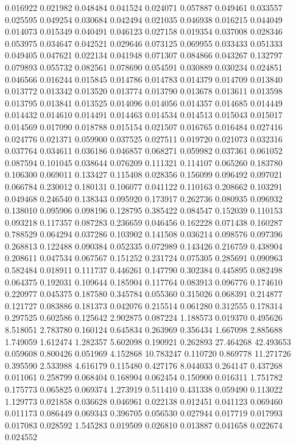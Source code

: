0.016922
0.021982
0.048484
0.041524
0.024071
0.057887
0.049461
0.033557
0.025595
0.049254
0.030684
0.042494
0.021035
0.046938
0.016215
0.044049
0.014073
0.015349
0.040491
0.046123
0.027158
0.019354
0.037008
0.028346
0.053975
0.034647
0.042521
0.029646
0.073125
0.069955
0.033433
0.051333
0.049405
0.047621
0.022134
0.041948
0.071307
0.084866
0.043267
0.132797
0.079893
0.055732
0.082561
0.078690
0.054591
0.030889
0.030234
0.024851
0.046566
0.016244
0.015845
0.014786
0.014783
0.014379
0.014709
0.013840
0.013772
0.013342
0.013520
0.013774
0.013790
0.013678
0.013611
0.013598
0.013795
0.013841
0.013525
0.014096
0.014056
0.014357
0.014685
0.014449
0.014432
0.014610
0.014491
0.014463
0.014534
0.014513
0.015043
0.015017
0.014569
0.017090
0.018788
0.015154
0.021507
0.016765
0.016484
0.027416
0.024776
0.021371
0.059900
0.037525
0.027511
0.019720
0.021073
0.032316
0.037764
0.034611
0.036186
0.046857
0.068271
0.059982
0.037361
0.061052
0.087594
0.101045
0.038644
0.076209
0.111321
0.114107
0.065260
0.183780
0.106300
0.069011
0.133427
0.115408
0.028356
0.156099
0.096492
0.097021
0.066784
0.230012
0.180131
0.106077
0.041122
0.110163
0.208662
0.103291
0.049468
0.246540
0.138343
0.095920
0.173917
0.262736
0.080935
0.096932
0.138010
0.095906
0.098196
0.128795
0.385422
0.084547
0.152039
0.110153
0.093218
0.117357
0.087283
0.236659
0.046456
0.162228
0.071438
0.160287
0.788529
0.064294
0.037286
0.103902
0.141508
0.036214
0.098576
0.097396
0.268813
0.122488
0.090384
0.052335
0.072989
0.143426
0.216759
0.438904
0.208611
0.047534
0.067567
0.151252
0.231724
0.075305
0.285691
0.090963
0.582484
0.018911
0.111737
0.446261
0.147790
0.302384
0.445895
0.082498
0.064375
0.192031
0.109644
0.185904
0.117764
0.083913
0.096776
0.174610
0.220977
0.045375
0.187580
0.345784
0.055360
0.315026
0.068391
0.214877
0.121727
0.083886
0.181373
0.042076
0.215514
0.061280
0.312555
0.178314
0.297525
0.602586
0.125642
2.902875
0.087224
1.188573
0.019370
0.495626
8.518051
2.783780
0.160124
0.645834
0.263969
0.356434
1.667098
2.885688
1.749059
1.612474
1.282357
5.602098
0.190921
0.262893
27.464268
42.493653
0.059608
0.800426
0.051969
4.152868
10.783247
0.110720
0.869778
11.271726
0.395590
2.533988
4.616179
0.115480
0.427176
8.044033
0.264147
0.437268
0.011061
0.258799
0.068404
0.168904
0.062454
0.150900
0.016311
1.751782
0.175773
0.065825
0.069374
1.273919
0.511410
0.431338
0.059490
0.113022
1.129773
0.021858
0.036628
0.046961
0.022138
0.012451
0.041123
0.069460
0.011173
0.086449
0.069343
0.396705
0.056530
0.027944
0.017719
0.017993
0.017083
0.028592
1.545283
0.019509
0.026810
0.013887
0.041658
0.022674
0.024552
